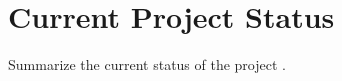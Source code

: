 \documentclass[10pt, b5paper]{article}
\begin{document}
\section{Current Project Status}
Summarize the current status of the project \cite{Figueredo:2009dg}. 




    
    
   
    
\nocite{*}
    


    
\end{document}
